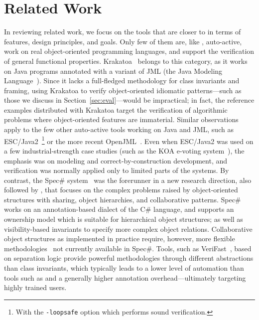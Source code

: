 \section{Related Work}
\label{sec:ap-related}


In reviewing related work, we focus on the tools that are closer to \AutoProof in terms of features, design principles, and goals.
Only few of them are, like \AutoProof, auto-active, work on real object-oriented programming languages, and support the verification of general functional properties.
Krakatoa~\cite{FILLIATRE07} belongs to this category, as it works on Java programs annotated with a variant of JML (the Java Modeling Language~\cite{LEAVENS05}).
Since it lacks a full-fledged methodology for class invariants and framing, using Krakatoa to verify object-oriented idiomatic patterns---such as those we discuss in Section~\ref{sec:eval}---would be impractical; in fact, the reference examples distributed with Krakatoa target the verification of algorithmic problems where object-oriented features are immaterial.
Similar observations apply to the few other auto-active tools working on Java and JML, such as ESC/Java2~\cite{COK05,CHALIN06}\footnote{With the \texttt{-loopsafe} option which performs sound verification.} or the more recent OpenJML~\cite{COK11,OPENJML}.
Even when ESC/Java2 was used on a few industrial-strength case studies (such as the KOA e-voting system~\cite{KINIRY07}), the emphasis was on modeling and correct-by-construction development, and verification was normally applied only to limited parts of the systems.
By contrast, the Spec\# system~\cite{BARNETT05,BARNETT11} was the forerunner in a new research direction, also followed by \AutoProof, that focuses on the complex problems raised by object-oriented structures with sharing, object hierarchies, and collaborative patterns.
Spec\# works on an annotation-based dialect of the C\# language, and supports an ownership model which is suitable for hierarchical object structures; as well as visibility-based invariants to specify more complex object relations.
Collaborative object structures as implemented in practice require, however, 
more flexible methodologies~\cite{POLIKARPOVA14} not currently available in Spec\#.
Tools, such as VeriFast~\cite{JACOBS10}, based on separation logic provide powerful methodologies through different abstractions than class invariants, which typically leads to a lower level of automation than tools such as \AutoProof and a generally higher annotation overhead---ultimately targeting highly trained users.


